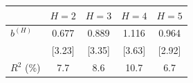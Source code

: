 \begin{tabular}{lcccc}
\toprule
 & $H=2$ & $H=3$ & $H=4$ & $H=5$ \\
\midrule
$b^{(H)}$ & 0.677 & 0.889 & 1.116 & 0.964 \\
 & [3.23] & [3.35] & [3.63] & [2.92] \\
$R^2$ (\%) & 7.7 & 8.6 & 10.7 & 6.7 \\
\bottomrule
\end{tabular}
